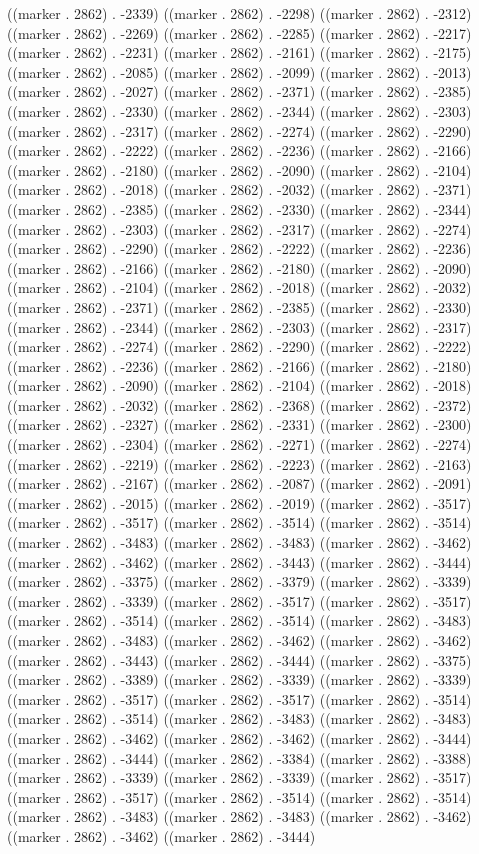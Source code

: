 ((marker . 2862) . -2339) ((marker . 2862) . -2298) ((marker . 2862) . -2312) ((marker . 2862) . -2269) ((marker . 2862) . -2285) ((marker . 2862) . -2217) ((marker . 2862) . -2231) ((marker . 2862) . -2161) ((marker . 2862) . -2175) ((marker . 2862) . -2085) ((marker . 2862) . -2099) ((marker . 2862) . -2013) ((marker . 2862) . -2027) ((marker . 2862) . -2371) ((marker . 2862) . -2385) ((marker . 2862) . -2330) ((marker . 2862) . -2344) ((marker . 2862) . -2303) ((marker . 2862) . -2317) ((marker . 2862) . -2274) ((marker . 2862) . -2290) ((marker . 2862) . -2222) ((marker . 2862) . -2236) ((marker . 2862) . -2166) ((marker . 2862) . -2180) ((marker . 2862) . -2090) ((marker . 2862) . -2104) ((marker . 2862) . -2018) ((marker . 2862) . -2032) ((marker . 2862) . -2371) ((marker . 2862) . -2385) ((marker . 2862) . -2330) ((marker . 2862) . -2344) ((marker . 2862) . -2303) ((marker . 2862) . -2317) ((marker . 2862) . -2274) ((marker . 2862) . -2290) ((marker . 2862) . -2222) ((marker . 2862) . -2236) ((marker . 2862) . -2166) ((marker . 2862) . -2180) ((marker . 2862) . -2090) ((marker . 2862) . -2104) ((marker . 2862) . -2018) ((marker . 2862) . -2032) ((marker . 2862) . -2371) ((marker . 2862) . -2385) ((marker . 2862) . -2330) ((marker . 2862) . -2344) ((marker . 2862) . -2303) ((marker . 2862) . -2317) ((marker . 2862) . -2274) ((marker . 2862) . -2290) ((marker . 2862) . -2222) ((marker . 2862) . -2236) ((marker . 2862) . -2166) ((marker . 2862) . -2180) ((marker . 2862) . -2090) ((marker . 2862) . -2104) ((marker . 2862) . -2018) ((marker . 2862) . -2032) ((marker . 2862) . -2368) ((marker . 2862) . -2372) ((marker . 2862) . -2327) ((marker . 2862) . -2331) ((marker . 2862) . -2300) ((marker . 2862) . -2304) ((marker . 2862) . -2271) ((marker . 2862) . -2274) ((marker . 2862) . -2219) ((marker . 2862) . -2223) ((marker . 2862) . -2163) ((marker . 2862) . -2167) ((marker . 2862) . -2087) ((marker . 2862) . -2091) ((marker . 2862) . -2015) ((marker . 2862) . -2019) ((marker . 2862) . -3517) ((marker . 2862) . -3517) ((marker . 2862) . -3514) ((marker . 2862) . -3514) ((marker . 2862) . -3483) ((marker . 2862) . -3483) ((marker . 2862) . -3462) ((marker . 2862) . -3462) ((marker . 2862) . -3443) ((marker . 2862) . -3444) ((marker . 2862) . -3375) ((marker . 2862) . -3379) ((marker . 2862) . -3339) ((marker . 2862) . -3339) ((marker . 2862) . -3517) ((marker . 2862) . -3517) ((marker . 2862) . -3514) ((marker . 2862) . -3514) ((marker . 2862) . -3483) ((marker . 2862) . -3483) ((marker . 2862) . -3462) ((marker . 2862) . -3462) ((marker . 2862) . -3443) ((marker . 2862) . -3444) ((marker . 2862) . -3375) ((marker . 2862) . -3389) ((marker . 2862) . -3339) ((marker . 2862) . -3339) ((marker . 2862) . -3517) ((marker . 2862) . -3517) ((marker . 2862) . -3514) ((marker . 2862) . -3514) ((marker . 2862) . -3483) ((marker . 2862) . -3483) ((marker . 2862) . -3462) ((marker . 2862) . -3462) ((marker . 2862) . -3444) ((marker . 2862) . -3444) ((marker . 2862) . -3384) ((marker . 2862) . -3388) ((marker . 2862) . -3339) ((marker . 2862) . -3339) ((marker . 2862) . -3517) ((marker . 2862) . -3517) ((marker . 2862) . -3514) ((marker . 2862) . -3514) ((marker . 2862) . -3483) ((marker . 2862) . -3483) ((marker . 2862) . -3462) ((marker . 2862) . -3462) ((marker . 2862) . -3444) 